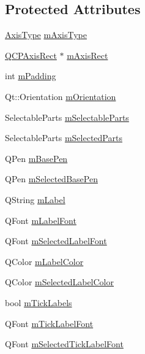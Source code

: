 \subsection*{Protected Attributes}
\begin{DoxyCompactItemize}
\item 
\hyperlink{class_q_c_p_axis_ae2bcc1728b382f10f064612b368bc18a}{Axis\+Type} \hyperlink{class_q_c_p_axis_ae704bf9f2c2b026f08dd4ccad79c616e}{m\+Axis\+Type}
\item 
\hyperlink{class_q_c_p_axis_rect}{Q\+C\+P\+Axis\+Rect} $\ast$ \hyperlink{class_q_c_p_axis_a6f150b65a202f32936997960e331dfcb}{m\+Axis\+Rect}
\item 
int \hyperlink{class_q_c_p_axis_a52a805a4f03231210e0880db7f77e098}{m\+Padding}
\item 
Qt\+::\+Orientation \hyperlink{class_q_c_p_axis_a048e1792fa86f4f86df55200b3f0be36}{m\+Orientation}
\item 
Selectable\+Parts \hyperlink{class_q_c_p_axis_ab9042d8a095998f27a28b39411d8b9c3}{m\+Selectable\+Parts}
\item 
Selectable\+Parts \hyperlink{class_q_c_p_axis_a8f1eb0abfe2ae64652aa46b360e841e4}{m\+Selected\+Parts}
\item 
Q\+Pen \hyperlink{class_q_c_p_axis_ad6b4a0aee9558fb35529e960b8fef72d}{m\+Base\+Pen}
\item 
Q\+Pen \hyperlink{class_q_c_p_axis_a80baa4e3c16f9b6edf3eccacd2a50fde}{m\+Selected\+Base\+Pen}
\item 
Q\+String \hyperlink{class_q_c_p_axis_ae8001dbdfc47685c1cf7b98b044460e6}{m\+Label}
\item 
Q\+Font \hyperlink{class_q_c_p_axis_a37442d470e30e19b81ecaf979a34d046}{m\+Label\+Font}
\item 
Q\+Font \hyperlink{class_q_c_p_axis_ae48fe3489afadc0b3cd003233e2bf19f}{m\+Selected\+Label\+Font}
\item 
Q\+Color \hyperlink{class_q_c_p_axis_a457a003bb1c2b6ab73e5a173ba7558fd}{m\+Label\+Color}
\item 
Q\+Color \hyperlink{class_q_c_p_axis_a94f57de3ba024471ca206d83cf2258dd}{m\+Selected\+Label\+Color}
\item 
bool \hyperlink{class_q_c_p_axis_a3e4315be072026644e69009557a2fa11}{m\+Tick\+Labels}
\item 
Q\+Font \hyperlink{class_q_c_p_axis_add79d1e39c4ed65869a1e9cc79043f3f}{m\+Tick\+Label\+Font}
\item 
Q\+Font \hyperlink{class_q_c_p_axis_a4f2e4919da9615dac612662c249b1119}{m\+Selected\+Tick\+Label\+Font}

\end{DoxyCompactItemize}
